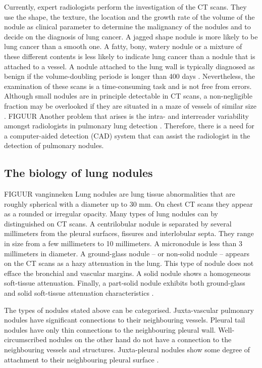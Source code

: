 Currently, expert radiologists perform the investigation of the
CT scans. They use the shape, the texture, the location and the growth rate of
the volume of the nodule as clinical parameter to determine the malignancy of
the nodules and to decide on the diagnosis of lung cancer. A jagged shape
nodule is more likely to be lung cancer than a smooth one. A fatty, bony,
watery nodule or a mixture of these different contents is less likely to
indicate lung cancer than a nodule that is attached to a vessel. A nodule
attached to the lung wall is typically diagnosed as benign if the
volume-doubling periode is longer than 400 days \cite{wu}. Nevertheless, the examination of these scans is a time-consuming task and is not free from errors. Although small nodules are
in principle detectable in CT scans, a non-negligible fraction may be overlooked
if they are situated in a maze of vessels of similar size \cite{ozekes}.
FIGUUR
Another problem that arises is the intra- and interreader variability
amongst radiologists in pulmonary lung detection \cite{armato} \cite{hens}. Therefore,
there is a need for a computer-aided detection (CAD) system that can assist the
radiologist in the detection of pulmonary nodules.

\subsection{The biology of lung nodules}
FIGUUR vanginneken
Lung nodules are lung tissue abnormalities that are roughly spherical with a
diameter up to 30 mm. On chest CT scans they appear as a rounded or
irregular opacity. Many types of lung nodules can by distinguished on CT scans.
A centrilobular nodule is separated by several millimeters from the pleural surfaces, fissures and
interlobular septa. They range in size from a few millimeters to 10 millimeters.
A micronodule is less than 3 millimeters in diameter. A ground-glass nodule --
or non-solid nodule -- appears on the CT scans as a hazy attenuation in the
lung. This type of nodule does not efface the bronchial and vascular margins. A solid
nodule shows a homogeneous soft-tissue attenuation. Finally, a part-solid nodule
exhibits both ground-glass and solid soft-tissue attenuation characteristics
\cite{nodule}. 

The types of nodules stated above can be categorised. Juxta-vascular
pulmonary nodules have significant connections to their neighbouring vessels.
Pleural tail nodules have only thin connections to the neighbouring pleural
wall. Well-circumscribed nodules on the other hand do not have a connection to
the neighbouring vessels and structures. Juxta-pleural nodules show some degree
of attachment to their neighbouring pleural surface \cite{kostis}.

